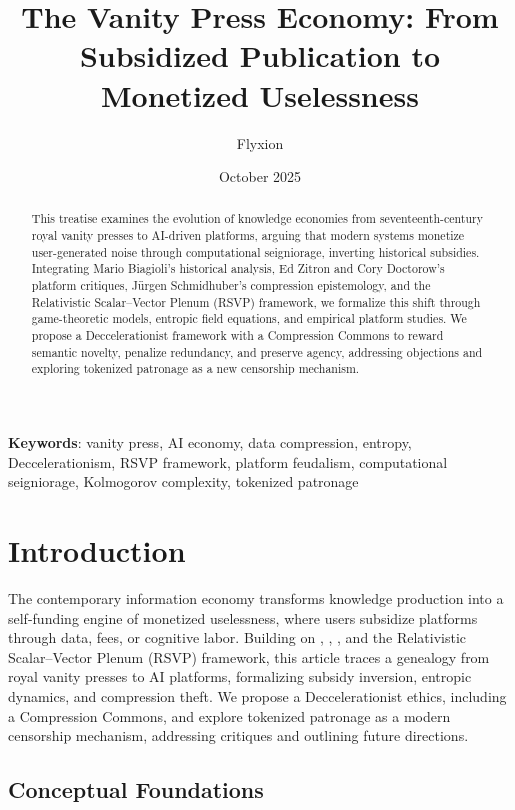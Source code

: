 \documentclass[12pt]{article}
\title{The Vanity Press Economy: From Subsidized Publication to Monetized Uselessness}
\author{Flyxion}
\date{October 2025}
\begin{document}
\maketitle

\begin{abstract}
This treatise examines the evolution of knowledge economies from seventeenth-century royal vanity presses to AI-driven platforms, arguing that modern systems monetize user-generated noise through computational seigniorage, inverting historical subsidies. Integrating Mario Biagioli’s historical analysis, Ed Zitron and Cory Doctorow’s platform critiques, Jürgen Schmidhuber’s compression epistemology, and the Relativistic Scalar–Vector Plenum (RSVP) framework, we formalize this shift through game-theoretic models, entropic field equations, and empirical platform studies. We propose a Deccelerationist framework with a Compression Commons to reward semantic novelty, penalize redundancy, and preserve agency, addressing objections and exploring tokenized patronage as a new censorship mechanism.
\end{abstract}

\textbf{Keywords}: vanity press, AI economy, data compression, entropy, Deccelerationism, RSVP framework, platform feudalism, computational seigniorage, Kolmogorov complexity, tokenized patronage

\printglossaries

\section{Introduction}

The contemporary information economy transforms knowledge production into a self-funding engine of monetized uselessness, where users subsidize platforms through data, fees, or cognitive labor. Building on \citet{Biagioli2002}, \citet{Zitron2023Rot,Doctorow2023}, \citet{Schmidhuber2009}, and the Relativistic Scalar–Vector Plenum (RSVP) framework, this article traces a genealogy from royal vanity presses to AI platforms, formalizing subsidy inversion, entropic dynamics, and compression theft. We propose a Deccelerationist ethics, including a Compression Commons, and explore tokenized patronage as a modern censorship mechanism, addressing critiques and outlining future directions.

\subsection{Conceptual Foundations}
\end{document}

